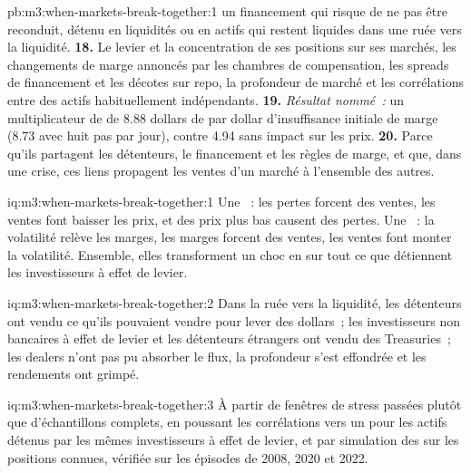 \begin{solution}{pb:m3:when-markets-break-together:1}
un financement qui risque de ne pas être reconduit, détenu en liquidités ou en actifs qui restent liquides dans une ruée vers la liquidité. \textbf{18.} Le levier et la concentration de ses positions sur ses marchés, les changements de marge
annoncés par les chambres de compensation, les spreads de financement et les décotes sur repo, la profondeur de marché et les corrélations entre des actifs habituellement indépendants.
\textbf{19.} \emph{Résultat nommé~:} un multiplicateur de  de 8.88 dollars de  par dollar d'insuffisance initiale de marge (8.73 avec huit pas
par jour), contre 4.94 sans impact sur les prix. \textbf{20.} Parce qu'ils partagent les détenteurs, le financement et les règles de marge, et que, dans une crise, ces liens propagent les ventes
d'un marché à l'ensemble des autres.
\end{solution}

\begin{solution}{iq:m3:when-markets-break-together:1}
Une ~: les pertes forcent des ventes, les ventes font baisser les prix, et des prix plus bas causent des pertes. Une ~: la volatilité relève les marges, les marges forcent des ventes, les ventes
font monter la volatilité. Ensemble, elles transforment un choc en  sur tout ce que détiennent les investisseurs à effet de levier.
\end{solution}

\begin{solution}{iq:m3:when-markets-break-together:2}
Dans la ruée vers la liquidité, les détenteurs ont vendu ce qu'ils pouvaient vendre pour lever des dollars~; les investisseurs non bancaires à effet de levier et les détenteurs étrangers ont vendu des Treasuries~; les dealers n'ont pas pu
absorber le flux, la profondeur s'est effondrée et les rendements ont grimpé.
\end{solution}

\begin{solution}{iq:m3:when-markets-break-together:3}
À partir de fenêtres de stress passées plutôt que d'échantillons complets, en poussant les corrélations vers un pour les actifs détenus par les mêmes investisseurs à effet de levier, et par simulation
des  sur les positions connues, vérifiée sur les épisodes de 2008, 2020 et 2022.
\end{solution}

